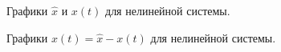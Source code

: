 \begin{figure}[!h]
	\caption{Графики $\hat{x}$ и $x(t)$ для нелинейной системы.}
	\label{6_lqg_nonlin2_x}
\end{figure}

\begin{figure}[!h]
	\caption{Графики $x(t) = \hat{x}-x(t)$ для нелинейной системы.}
	\label{6_lqg_nonlin2_e}
\end{figure}

\endinput